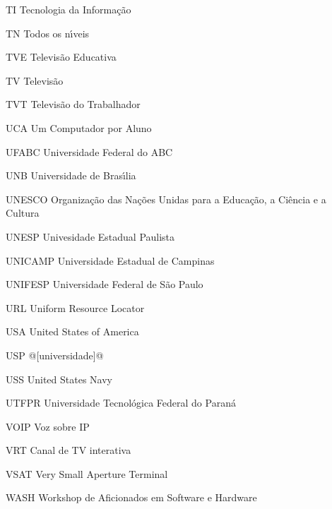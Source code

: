 \begin{siglas}
\item[TI] Tecnologia da Informa\c{c}\~ao
\item[TN] Todos os n\'{\i}veis
\item[TVE] Televis\~ao Educativa
\item[TV] Televis\~ao
\item[TVT] Televis\~ao do Trabalhador
\item[UCA] Um Computador por Aluno
\item[UFABC] Universidade Federal do ABC 
\item[UNB] Universidade de Bras\'{\i}lia
\item[UNESCO] Organiza\c{c}\~ao das Na\c{c}\~oes Unidas para a Educa\c{c}\~ao, a Ci\^encia e a Cultura  
\item[UNESP] Univesidade Estadual Paulista
\item[UNICAMP] Universidade Estadual de Campinas
\item[UNIFESP] Universidade Federal de S\~ao Paulo
\item[URL] Uniform Resource Locator
\item[USA] United States of America
\item[USP] @[universidade]@
\item[USS] United States Navy
\item[UTFPR] Universidade Tecnol\'ogica Federal do Paran\'a
\item[VOIP] Voz sobre IP
\item[VRT] Canal de TV interativa
\item[VSAT] Very Small Aperture Terminal
\item[WASH] Workshop de Aficionados em Software e Hardware

\end{siglas}
